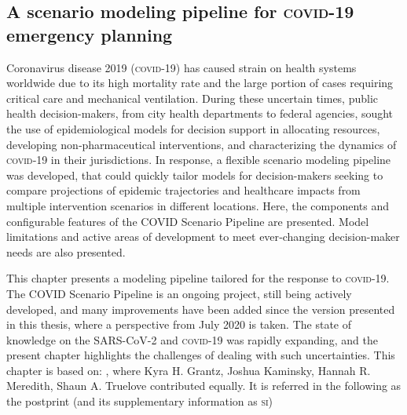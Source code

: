 \begin{fullwidth}
\chapter[A scenario modeling pipeline for \textsc{covid}-19 emergency planning]{A scenario modeling pipeline for \textsc{covid}-19 \\emergency planning}
\label{sec:covid-pipeline-reports}
Coronavirus disease 2019 (\textsc{covid}-19) has caused strain on health systems worldwide due to its high mortality rate and the large portion of cases requiring critical care and mechanical ventilation. During these uncertain times, public health decision-makers, from city health departments to federal agencies, sought the use of epidemiological models for decision support in allocating resources, developing non‑pharmaceutical interventions, and characterizing the dynamics of \textsc{covid}‑19 in their jurisdictions. In response, a flexible scenario modeling pipeline was developed, that could quickly tailor models for decision-makers seeking to compare projections of epidemic trajectories and healthcare impacts from multiple intervention scenarios in different locations. Here, the components and configurable features of the COVID  Scenario Pipeline are presented. Model limitations and active areas of development to meet ever‑changing decision-maker needs are also presented.
  
This chapter presents a modeling pipeline tailored for the response to \textsc{covid}-19. The COVID  Scenario Pipeline is an ongoing project, still being actively developed, and many improvements have been added since the version presented in this thesis,  where a perspective from July 2020 is taken. The state of knowledge on the SARS-CoV-2 and \textsc{covid}-19 was rapidly expanding, and the present chapter highlights the challenges of dealing with such uncertainties. This chapter is based on:
, where Kyra H. Grantz, Joshua Kaminsky, Hannah R. Meredith, Shaun A. Truelove contributed equally. It is referred in the following as the postprint (and its supplementary information as \textsc{si})
  \end{fullwidth}


